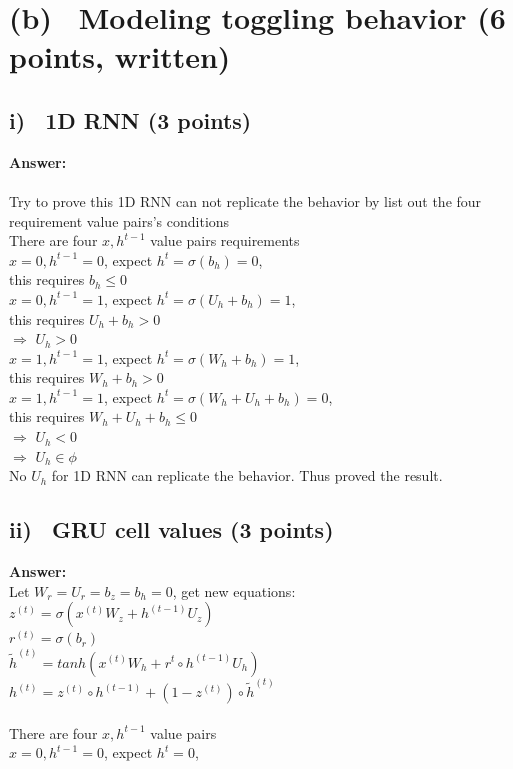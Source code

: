 \documentclass[fleqn]{MJD}
\newcommand{\subproblem}[2]{\section{(#1)~ #2}}
\newcommand{\subsubproblem}[2]{\subsection{ #1)~ #2}}
\newcommand{\0}{\emptyset}
\begin{document}
\subproblem{b}{Modeling toggling behavior (6 points, written)}
\subsubproblem{i} {1D RNN (3 points)}
\noindent \textbf{Answer:} \\ \\
\indent Try to prove this 1D RNN can not replicate the behavior by list out the four requirement value pairs's conditions \\
\indent There are four $x,h^{t-1}$ value pairs requirements\\
\indent \indent $x=0, h^{t-1}=0$, expect $h^{t}=\sigma(b_{h})=0$, \\
\indent \indent \indent this requires $b_{h} \le 0$ \\
\indent \indent $x=0, h^{t-1}=1$, expect $h^{t}=\sigma(U_{h} + b_{h})=1$, \\ 
\indent \indent \indent this requires $U_{h} + b_{h} > 0$\\
\indent \indent $\Rightarrow$ $U_{h} > 0$\\
\indent \indent $x=1, h^{t-1}=1$, expect $h^{t}=\sigma(W_{h} + b_{h})=1$, \\
\indent \indent \indent this requires $W_{h} + b_{h} > 0$ \\
\indent \indent $x=1, h^{t-1}=1$, expect $h^{t}=\sigma(W_{h} + U_{h} + b_{h})=0$, \\
\indent \indent \indent this requires $W_{h} + U_{h} + b_{h} \le 0$ \\
\indent \indent $\Rightarrow$ $U_{h} < 0$ \\
\indent \indent $\Rightarrow$ $U_{h} \in \phi$ \\
\indent No $U_{h}$ for 1D RNN can replicate the behavior. Thus proved the result.
\subsubproblem{ii} {GRU cell values (3 points)}
\noindent \textbf{Answer:} \\
\indent Let $W_{r} = U_{r} = b_{z} = b_{h} = 0$, get new equations: \\
\indent \indent $z^{(t)}=\sigma(x^{(t)}W_{z} + h^{(t-1)}U_{z})$\\
\indent \indent $r^{(t)}=\sigma(b_{r})$\\
\indent \indent $\tilde{h}^{(t)}=tanh(x^{(t)}W_{h} + r^{t} \circ h^{(t-1)}U_{h})$\\
\indent \indent $h^{(t)}=z^{(t)} \circ  h^{(t-1)} + (1 - z^{(t)}) \circ \tilde{h}^{(t)} $ \\ \\
\indent There are four $x,h^{t-1}$ value pairs \\
\indent \indent $x=0, h^{t-1}=0$, expect $h^{t}=0$, \\
\end{document}
